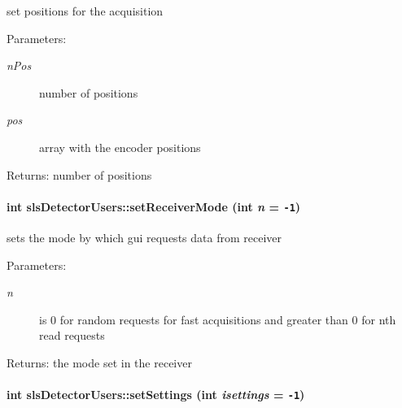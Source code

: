 set positions for the acquisition 

\begin{Desc}
\item[Parameters:]
\begin{description}
\item[{\em n\-Pos}]number of positions \item[{\em pos}]array with the encoder positions \end{description}
\end{Desc}
\begin{Desc}
\item[Returns:]number of positions \end{Desc}
\hypertarget{classslsDetectorUsers_db084473ffe61960b86abdfa8efcc80d}{
\paragraph[setReceiverMode]{\setlength{\rightskip}{0pt plus 5cm}int sls\-Detector\-Users::set\-Receiver\-Mode (int {\em n} = {\tt -1})}\hfill}
\label{classslsDetectorUsers_db084473ffe61960b86abdfa8efcc80d}


sets the mode by which gui requests data from receiver 

\begin{Desc}
\item[Parameters:]
\begin{description}
\item[{\em n}]is 0 for random requests for fast acquisitions and greater than 0 for nth read requests \end{description}
\end{Desc}
\begin{Desc}
\item[Returns:]the mode set in the receiver \end{Desc}
\hypertarget{classslsDetectorUsers_31b25d2659d3b244bb10b5516a9fd957}{
\paragraph[setSettings]{\setlength{\rightskip}{0pt plus 5cm}int sls\-Detector\-Users::set\-Settings (int {\em isettings} = {\tt -1})}\hfill}
\label{classslsDetectorUsers_31b25d2659d3b244bb10b5516a9fd957}


